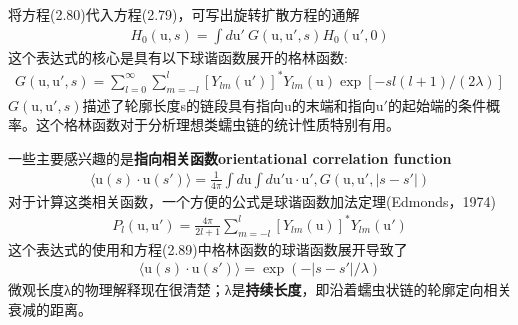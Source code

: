 将方程(2.80)代入方程(2.79)，可写出旋转扩散方程的通解
\begin{gather}
H_0(\mathrm{u},s)=\int d\mathrm{u}'\ G(\mathrm{u},\mathrm{u}',s)H_0(\mathrm{u}',0)
\end{gather}
这个表达式的核心是具有以下球谐函数展开的格林函数:\\
\begin{gather}
G(\mathrm{u},\mathrm{u}',s) = \sum_{l=0}^{\infty}\sum_{m=-l}^{l}\left[Y_{lm}(\mathrm{u}')\right]^*Y_{lm}(\mathrm{u})\exp[-sl(l+1)/(2\lambda)]
\end{gather}
$G(\mathrm{u},\mathrm{u}',s)$描述了轮廓长度s的链段具有指向$\mathrm{u}$的末端和指向$\mathrm{u}'$的起始端的条件概率。这个格林函数对于分析理想类蠕虫链的统计性质特别有用。

一些主要感兴趣的是\textbf{指向相关函数orientational correlation function}\\
\begin{gather}
\langle \mathrm{u}(s)\cdot \mathrm{u}(s')\rangle =\frac{1}{4\pi}\int d\mathrm{u}\int d\mathrm{u}'\mathrm{u}\cdot \mathrm{u}',G(\mathrm{u},\mathrm{u}',|s-s'|)
\end{gather}
对于计算这类相关函数，一个方便的公式是球谐函数加法定理(Edmonds，1974)\\
\begin{gather}
P_l(\mathrm{u},\mathrm{u}')=\frac{4\pi}{2l+1}\sum_{m=-l}^{l}[Y_{lm}(\mathrm{u})]^*Y_{lm}(\mathrm{u}')
\end{gather}
这个表达式的使用和方程(2.89)中格林函数的球谐函数展开导致了\\
\begin{gather}
\langle \mathrm{u}(s) \cdot \mathrm{u}(s')\rangle=\exp(-|s-s'|/\lambda)
\end{gather}
微观长度λ的物理解释现在很清楚；λ是\textbf{持续长度}，即沿着蠕虫状链的轮廓定向相关衰减的距离。\\

